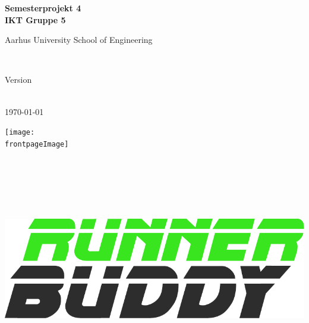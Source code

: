 \begin{center}
	{\fontsize{36pt}{0}\selectfont
		\textbf{
		Semesterprojekt 4\\
		IKT Gruppe 5\\
		}
	}
	\vspace{20pt}

	{\fontsize{14pt}{0}\selectfont
		Aarhus University School of Engineering\\
	}
	\vspace{20pt}

	{\fontsize{24pt}{0}\selectfont
		\thetitle\\
	}
	\vspace{20pt}

	{\fontsize{18pt}{0}\selectfont
		Version \vhCurrentVersion\\
	}
	\vspace{20pt}

	{\fontsize{18pt}{0}\selectfont
		\ifdefined\frontpageDate
			\frontpageDate\\
		\else
			\today\\
		\fi
	}
	\vspace*{\fill}

	\ifdefined\frontpageImage
		\texttt{[image: \\frontpageImage]}
	\else
		\includegraphics[width=0.85\linewidth,height=300pt,keepaspectratio]{ForsideLogo.pdf}
	\fi
	\vspace*{\fill}


\end{center}
